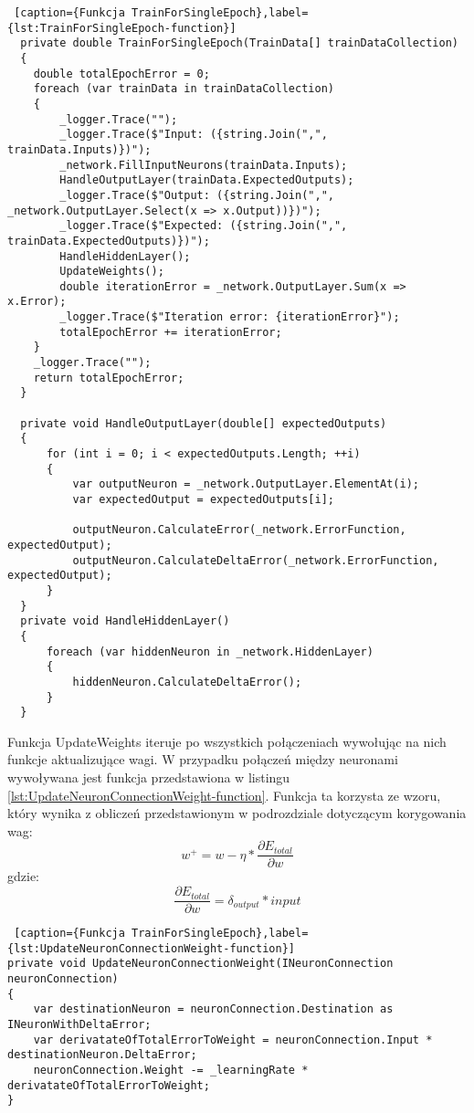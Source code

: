 \begin{lstlisting} [caption={Funkcja TrainForSingleEpoch},label={lst:TrainForSingleEpoch-function}]
  private double TrainForSingleEpoch(TrainData[] trainDataCollection)
  {
    double totalEpochError = 0;
    foreach (var trainData in trainDataCollection)
    {
        _logger.Trace("");
        _logger.Trace($"Input: ({string.Join(",", trainData.Inputs)})");
        _network.FillInputNeurons(trainData.Inputs);
        HandleOutputLayer(trainData.ExpectedOutputs);
        _logger.Trace($"Output: ({string.Join(",", _network.OutputLayer.Select(x => x.Output))})");
        _logger.Trace($"Expected: ({string.Join(",", trainData.ExpectedOutputs)})");
        HandleHiddenLayer();
        UpdateWeights();
        double iterationError = _network.OutputLayer.Sum(x => x.Error);
        _logger.Trace($"Iteration error: {iterationError}");
        totalEpochError += iterationError;
    }
    _logger.Trace("");
    return totalEpochError;
  }

  private void HandleOutputLayer(double[] expectedOutputs)
  {
      for (int i = 0; i < expectedOutputs.Length; ++i)
      {
          var outputNeuron = _network.OutputLayer.ElementAt(i);
          var expectedOutput = expectedOutputs[i];

          outputNeuron.CalculateError(_network.ErrorFunction, expectedOutput);
          outputNeuron.CalculateDeltaError(_network.ErrorFunction, expectedOutput);
      }
  }
  private void HandleHiddenLayer()
  {
      foreach (var hiddenNeuron in _network.HiddenLayer)
      {
          hiddenNeuron.CalculateDeltaError();
      }
  }

\end{lstlisting}

Funkcja UpdateWeights iteruje po wszystkich połączeniach wywołując na nich funkcje aktualizujące wagi.
W przypadku połączeń między neuronami wywoływana jest funkcja przedstawiona w listingu \ref{lst:UpdateNeuronConnectionWeight-function}.
Funkcja ta korzysta ze wzoru, który wynika z obliczeń przedstawionym w podrozdziale dotyczącym korygowania wag:
\[
w^+=w-\eta*\frac{\partial E_{total}}{\partial w}  
\]
gdzie:
\[
  \frac{\partial E_{total}}{\partial w}  =\delta_{output}*input
\]

\begin{lstlisting} [caption={Funkcja TrainForSingleEpoch},label={lst:UpdateNeuronConnectionWeight-function}]
private void UpdateNeuronConnectionWeight(INeuronConnection neuronConnection)
{
    var destinationNeuron = neuronConnection.Destination as INeuronWithDeltaError;
    var derivatateOfTotalErrorToWeight = neuronConnection.Input * destinationNeuron.DeltaError;
    neuronConnection.Weight -= _learningRate * derivatateOfTotalErrorToWeight;
}
\end{lstlisting}

